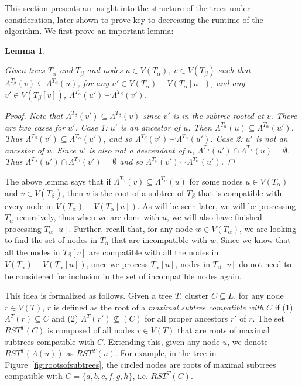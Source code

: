\documentclass{article}
\newcommand{\compatible}{\smile}
\newcommand{\leafset}{\Lambda}
\newcommand{\TA}{T_\alpha}
\newcommand{\TB}{T_\beta}
\newtheorem{reconsideringcompatiblesubsets}[incompatibility]{Lemma}
\begin{document}
    This section presents an insight into the structure of the trees under consideration, later shown to prove key to decreasing the runtime of the algorithm. We first prove an important lemma:
    \newline

    \begin{reconsideringcompatiblesubsets}
        \label{lem:reconsideringcompatiblesubsets}

        Given trees $\TA$ and $\TB$ and nodes $u \in V(\TA)$, $v \in V(\TB)$ such that $\leafset^{\TB}(v) \subseteq \leafset^{\TA}(u)$, for any $u' \in V(\TA) - V(\TA[u])$, and any $v' \in V(\TB[v])$, $\leafset^{\TA}(u') \compatible \leafset^{\TB}(v')$.

        \begin{proof}
            Note that $\leafset^{\TB}(v') \subseteq \leafset^{\TB}(v)$ since $v'$ is in the subtree rooted at $v$. There are two cases for $u'$. \textit{Case 1}: $u'$ is an ancestor of $u$. Then $\leafset^{\TA}(u) \subseteq \leafset^{\TA}(u')$. Thus $\leafset^{\TB}(v') \subseteq \leafset^{\TA}(u')$, and so $\leafset^{\TB}(v') \compatible \leafset^{\TA}(u')$. \textit{Case 2}: $u'$ is not an ancestor of $u$. Since $u'$ is also not a descendant of $u$, $\leafset^{\TA}(u') \cap \leafset^{\TA}(u) = \emptyset$. Thus $\leafset^{\TA}(u') \cap \leafset^{\TB}(v') = \emptyset$ and so $\leafset^{\TB}(v') \compatible \leafset^{\TA}(u')$.
        \end{proof}
    \end{reconsideringcompatiblesubsets}

    The above lemma says that if $\leafset^{\TB}(v) \subseteq \leafset^{\TA}(u)$ for some nodes $u \in V(\TA)$ and $v \in V(\TB)$, then $v$ is the root of a subtree of $\TB$ that is compatible with every node in $V(\TA) - V(\TA[u])$. As will be seen later, we will be processing $\TA$ recursively, thus when we are done with $u$, we will also have finished processing $\TA[u]$. Further, recall that, for any node $w \in V(\TA)$, we are looking to find the set of nodes in $\TB$ that are incompatible with $w$. Since we know that all the nodes in $\TB[v]$ are compatible with all the nodes in $V(\TA) - V(\TA[u])$, once we process $\TA[u]$, nodes in $\TB[v]$ do not need to be considered for inclusion in the set of incompatible nodes again.

    This idea is formalized as follows. Given a tree $T$, cluster $C \subseteq L$, for any node $r \in V(T)$, $r$ is defined as the root of a \textit{maximal subtree compatible with $C$} if (1) $\leafset^T(r) \subseteq C$ and (2) $\leafset^T(r') \not\subseteq(C)$ for all proper ancestors $r'$ of $r$. The set $RST^{T}(C)$ is composed of all nodes $r \in V(T)$ that are roots of maximal subtrees compatible with $C$. Extending this, given any node $u$, we denote $RST^{T}(\leafset(u))$ as $RST^{T}(u)$. For example, in the tree in Figure~\ref{fig:rootsofsubtrees}, the circled nodes are roots of maximal subtrees compatible with $C = \{a, b, c, f, g, h\}$, i.e. $RST^{T}(C)$.
\end{document}
